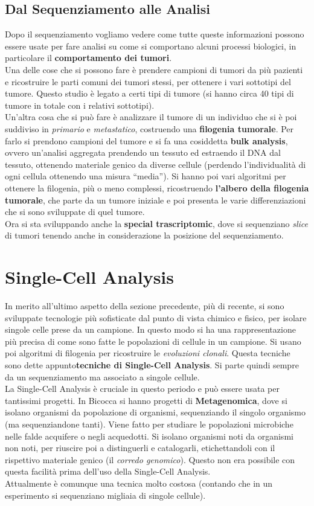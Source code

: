\documentclass[a4paper,12pt, oneside]{book}
\begin{document}
\subsection{Dal Sequenziamento alle Analisi}
Dopo il sequenziamento vogliamo vedere come tutte queste informazioni possono
essere usate per fare analisi su come si comportano alcuni processi biologici,
in particolare il \textbf{comportamento dei tumori}.\\
Una delle cose che si possono fare è prendere campioni di tumori da più pazienti
e ricostruire le parti comuni dei tumori stessi, per ottenere i vari sottotipi
del tumore. Questo studio è legato a certi
tipi di tumore (si hanno circa 40 tipi di tumore in totale con i relativi
sottotipi).  \\
Un'altra cosa che si può fare è analizzare il tumore di un individuo che si è
poi suddiviso in \textit{primario} e \textit{metastatico}, costruendo una
\textbf{filogenia tumorale}. Per farlo si prendono campioni del tumore e si fa
una cosiddetta \textbf{bulk analysis}, ovvero un'analisi aggregata prendendo un
tessuto ed estraendo il DNA dal tessuto, ottenendo materiale genico da diverse
cellule (perdendo l'individualità di ogni cellula ottenendo una misura
``media''). Si hanno poi vari algoritmi per ottenere la filogenia, più o meno
complessi, ricostruendo \textbf{l'albero della filogenia tumorale}, che parte da
un tumore iniziale e poi presenta le varie differenziazioni che si sono
sviluppate di quel tumore.\\
Ora si sta sviluppando anche la \textbf{special trascriptomic}, dove si
sequenziano \textit{slice} di tumori tenendo anche in considerazione la
posizione del sequenziamento. 
\section{Single-Cell Analysis}
In merito all'ultimo aspetto della sezione precedente, più di recente, si sono
sviluppate tecnologie più sofisticate dal punto di vista chimico e fisico, per
isolare singole celle prese da un campione. In questo modo si ha una
rappresentazione più precisa di come sono fatte le popolazioni di cellule in un
campione. Si usano poi algoritmi di filogenia per ricostruire le
\textit{evoluzioni clonali}. Questa tecniche sono dette
appunto\textbf{tecniche di Single-Cell Analysis}. Si parte quindi sempre da un
sequenziamento ma associato a singole cellule.\\
La Single-Cell Analysis è cruciale in questo periodo e può essere usata per
tantissimi progetti. In Bicocca si hanno progetti di \textbf{Metagenomica}, dove
si isolano organismi da popolazione di organismi, sequenziando il singolo
organismo (ma sequenziandone tanti). Viene fatto per studiare le popolazioni
microbiche nelle falde acquifere o negli acquedotti. Si isolano organismi noti
da organismi non noti, per riuscire poi a distinguerli e catalogarli,
etichettandoli con il rispettivo materiale genico (il \textit{corredo
  genomico}). Questo non era possibile con questa facilità prima dell'uso della
Single-Cell Analysis. \\
Attualmente è comunque una tecnica molto costosa (contando che in un esperimento
si sequenziano migliaia di singole cellule).
\end{document}
